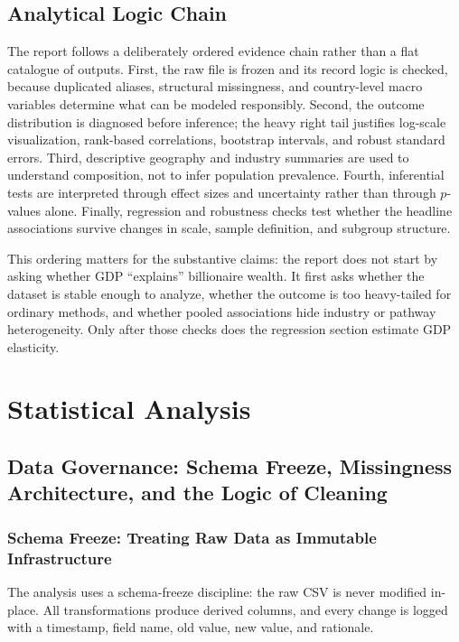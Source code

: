 \documentclass[a4paper,10pt]{article}
\begin{document}
\subsection{Analytical Logic Chain}
The report follows a deliberately ordered evidence chain rather than a flat catalogue of outputs.
First, the raw file is frozen and its record logic is checked, because duplicated aliases, structural missingness, and country-level macro variables determine what can be modeled responsibly.
Second, the outcome distribution is diagnosed before inference; the heavy right tail justifies log-scale visualization, rank-based correlations, bootstrap intervals, and robust standard errors.
Third, descriptive geography and industry summaries are used to understand composition, not to infer population prevalence.
Fourth, inferential tests are interpreted through effect sizes and uncertainty rather than through $p$-values alone.
Finally, regression and robustness checks test whether the headline associations survive changes in scale, sample definition, and subgroup structure.

This ordering matters for the substantive claims: the report does not start by asking whether GDP ``explains'' billionaire wealth. It first asks whether the dataset is stable enough to analyze, whether the outcome is too heavy-tailed for ordinary methods, and whether pooled associations hide industry or pathway heterogeneity. Only after those checks does the regression section estimate GDP elasticity.

\bigskip

\section{Statistical Analysis}\label{sec:stats}

\subsection{Data Governance: Schema Freeze, Missingness Architecture, and the Logic of Cleaning}\label{sec:data}

\subsubsection{Schema Freeze: Treating Raw Data as Immutable Infrastructure}
The analysis uses a schema-freeze discipline: the raw CSV is never modified in-place. All transformations produce derived columns, and every change is logged with a timestamp, field name, old value, new value, and rationale.
\end{document}
